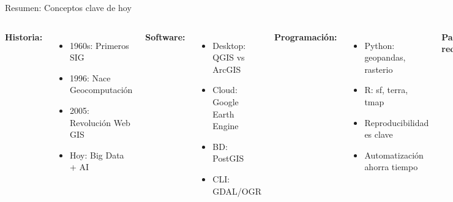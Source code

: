 \documentclass[10pt]{beamer}
\begin{document}
\begin{frame}{Resumen: Conceptos clave de hoy}
    \begin{columns}
        \textbf{Historia:}
        \begin{itemize}
            \item 1960s: Primeros SIG
            \item 1996: Nace Geocomputación
            \item 2005: Revolución Web GIS
            \item Hoy: Big Data + AI
        \end{itemize}
        
        \textbf{Software:}
        \begin{itemize}
            \item Desktop: QGIS vs ArcGIS
            \item Cloud: Google Earth Engine
            \item BD: PostGIS
            \item CLI: GDAL/OGR
        \end{itemize}
        
        \textbf{Programación:}
        \begin{itemize}
            \item Python: geopandas, rasterio
            \item R: sf, terra, tmap
            \item Reproducibilidad es clave
            \item Automatización ahorra tiempo
        \end{itemize}
        
        \textbf{Para recordar:}
        \begin{itemize}
            \item Open source es viable
            \item Python líder en la industria
            \item R excelente para estadística
            \item Práctica hace al maestro
        \end{itemize}
    \end{columns}
\end{frame}
\end{document}
